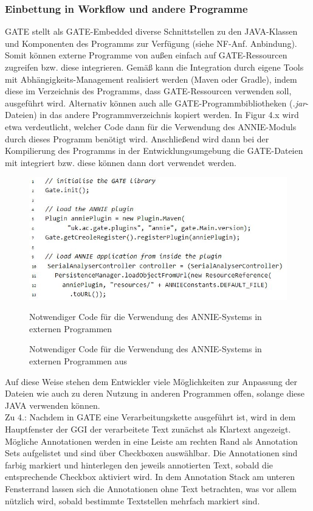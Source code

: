 \documentclass[12pt]{report}
\begin{document}
\subsubsection{Einbettung in Workflow und andere Programme}
GATE stellt als GATE-Embedded diverse Schnittstellen zu den JAVA-Klassen und Komponenten des Programms zur Verfügung (siehe NF-Anf. \glqq  Anbindung\grqq{}). Somit können externe Programme von außen einfach auf GATE-Ressourcen zugreifen bzw. diese integrieren. Gemäß \cite{gt18} kann die Integration durch eigene Tools mit Abhängigkeits-Management realisiert werden (Maven oder Gradle), indem diese im Verzeichnis des Programms, dass GATE-Ressourcen verwenden soll, ausgeführt wird. Alternativ können auch alle GATE-Programmbibliotheken (\textit{.jar}-Dateien) in das andere Programmverzeichnis kopiert werden. In Figur 4.x wird etwa verdeutlicht, welcher Code dann für die Verwendung des ANNIE-Moduls durch dieses Programm benötigt wird. Anschließend wird dann bei der Kompilierung des Programms in der Entwicklungsumgebung die GATE-Dateien mit integriert bzw. diese können dann dort verwendet werden. 
 
\begin{figure}[h!]
\begin{center}
\includegraphics[scale=0.8]{GATE_Bilder/Einbettung.jpg}
\caption{Notwendiger Code für die Verwendung des ANNIE-Systems in externen Programmen}
\caption{Notwendiger Code für die Verwendung des ANNIE-Systems in externen Programmen aus \cite{gt18}}
\end{center}
\end{figure}

Auf diese Weise stehen dem Entwickler viele Möglichkeiten zur Anpassung der Dateien wie auch zu deren Nutzung in anderen Programmen offen, solange diese JAVA verwenden können.\\

Zu 4.: Nachdem in GATE eine Verarbeitungskette ausgeführt ist, wird in dem Hauptfenster der GGI der verarbeitete Text zunächst als Klartext angezeigt. Mögliche Annotationen werden in eine Leiste am rechten Rand als \glqq  Annotation Sets\grqq{} aufgelistet und sind über Checkboxen auswählbar. Die Annotationen sind farbig markiert und hinterlegen den jeweils annotierten Text, sobald die entsprechende Checkbox aktiviert wird.
In dem Annotation Stack am unteren Fensterrand lassen sich die Annotationen ohne Text betrachten, was vor allem nützlich wird, sobald bestimmte Textstellen mehrfach markiert sind.\\
\end{document}
